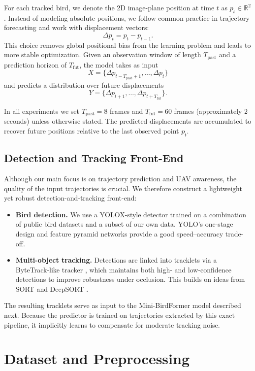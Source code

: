 \documentclass[journal]{IEEEtran}
\begin{document}
For each tracked bird, we denote the 2D image-plane position at time $t$ as $p_t \in \mathbb{R}^2$. Instead of modeling absolute positions, we follow common practice in trajectory forecasting and work with displacement vectors:
\[
\Delta p_t = p_t - p_{t-1}.
\]
This choice removes global positional bias from the learning problem and leads to more stable optimization. Given an observation window of length $T_{\text{past}}$ and a prediction horizon of $T_{\text{fut}}$, the model takes as input
\[
X = \{\Delta p_{t-T_{\text{past}}+1}, \ldots, \Delta p_{t}\}
\]
and predicts a distribution over future displacements
\[
Y = \{\Delta p_{t+1}, \ldots, \Delta p_{t+T_{\text{fut}}}\}.
\]

In all experiments we set $T_{\text{past}} = 8$ frames and $T_{\text{fut}} = 60$ frames (approximately 2 seconds) unless otherwise stated. The predicted displacements are accumulated to recover future positions relative to the last observed point $p_t$.

\subsection{Detection and Tracking Front-End}

Although our main focus is on trajectory prediction and UAV awareness, the quality of the input trajectories is crucial. We therefore construct a lightweight yet robust detection-and-tracking front-end:

\begin{itemize}
	\item \textbf{Bird detection.} We use a YOLOX-style detector \cite{Ge2021YOLOX} trained on a combination of public bird datasets and a subset of our own data. YOLO's one-stage design \cite{Redmon2016YOLO} and feature pyramid networks \cite{Lin2017FPN} provide a good speed--accuracy trade-off.
	\item \textbf{Multi-object tracking.} Detections are linked into tracklets via a ByteTrack-like tracker \cite{Zhang2021ByteTrack}, which maintains both high- and low-confidence detections to improve robustness under occlusion. This builds on ideas from SORT and DeepSORT \cite{Bewley2016SORT,Wojke2017DeepSORT}.
\end{itemize}

The resulting tracklets serve as input to the Mini-BirdFormer model described next. Because the predictor is trained on trajectories extracted by this exact pipeline, it implicitly learns to compensate for moderate tracking noise.
\section{Dataset and Preprocessing}
\label{sec:dataset}
\end{document}
